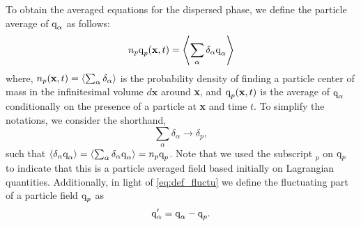 To obtain the averaged equations for the dispersed phase, we define the particle average of $\text q_\alpha$​ as follows:
\begin{equation}
     n_p \text q_p(\textbf{x},t) = \left<\sum_\alpha\delta_\alpha \text q_\alpha\right>
     \label{eq:p_avg}
\end{equation}
where, $n_p(\textbf{x},t) = \left<\sum_\alpha \delta_\alpha\right>$ is the probability density of finding a particle center of mass in the infinitesimal volume $d\textbf{x}$ around \textbf{x}, and $\text q_p(\textbf{x},t)$ is the average of $\text q_\alpha$ conditionally on the presence of a particle at \textbf{x} and time $t$. 
To simplify the notations, we consider the shorthand,
\begin{equation*}
    \sum_\alpha \delta_\alpha \to \delta_p, 
\end{equation*}
such that $\left<\delta_\alpha \text q_\alpha\right>=\left<\sum_\alpha \delta_\alpha \text q_\alpha\right>=n_p\text q_p$.
Note that we used the subscript $_p$ on $\text q_p$ to indicate that this is a particle averaged field based initially on Lagrangian quantities.  
Additionally, in light of \ref{eq:def_fluctu} we define the fluctuating part of a particle field $\text q_p$ as
\begin{equation}
    \text q_\alpha' = \text q_\alpha - \text q_p. 
    \label{eq:def_fluc_p}
\end{equation}

